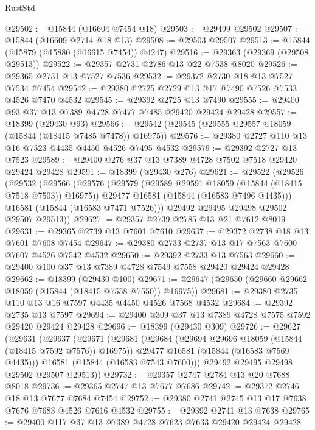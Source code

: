 \begin{lexlean}{RustStd}
\begin{coremodule}
@29502 := @15844 (@16604 @7454 @18)
@29503 := @29499 @29502
@29507 := @15844 (@16609 @2714 @18 @13)
@29508 := @29503 @29507
@29513 := @15844 (@15879 (@15880 (@16615 @7454)) @4247)
@29516 := @29363 (@29369 (@29508 @29513))
@29522 := @29357 @2731 @2786 @13 @22 @7538 @8020
@29526 := @29365 @2731 @13 @7527 @7536
@29532 := @29372 @2730 @18 @13 @7527 @7534 @7454
@29542 := @29380 @2725 @2729 @13 @17 @7490 @7526 @7533 @4526 @7470 @4532
@29545 := @29392 @2725 @13 @7490
@29555 := @29400 @93 @37 @13 @7389 @4728 @7477 @7485 @29420 @29424 @29428
@29557 := @18399 (@29430 @93)
@29566 := @29542 (@29545 (@29555 @29557 @18059 (@15844 (@18415 @7485 @7478)) @16975))
@29576 := @29380 @2727 @110 @13 @16 @7523 @4435 @4450 @4526 @7495 @4532
@29579 := @29392 @2727 @13 @7523
@29589 := @29400 @276 @37 @13 @7389 @4728 @7502 @7518 @29420 @29424 @29428
@29591 := @18399 (@29430 @276)
@29621 := @29522
    (@29526
      (@29532
        (@29566
          (@29576
            (@29579 (@29589 @29591 @18059 (@15844 (@18415 @7518 @7503)) @16975))
            @29477
            @16581
            (@15844 (@16583 @7496 @4435)))
          @16581
          (@15844 (@16583 @7471 @7526)))
        @29492
        @29495
        @29498
        @29502
        @29507
        @29513))
@29627 := @29357 @2739 @2785 @13 @21 @7612 @8019
@29631 := @29365 @2739 @13 @7601 @7610
@29637 := @29372 @2738 @18 @13 @7601 @7608 @7454
@29647 := @29380 @2733 @2737 @13 @17 @7563 @7600 @7607 @4526 @7542 @4532
@29650 := @29392 @2733 @13 @7563
@29660 := @29400 @100 @37 @13 @7389 @4728 @7549 @7558 @29420 @29424 @29428
@29662 := @18399 (@29430 @100)
@29671 := @29647 (@29650 (@29660 @29662 @18059 (@15844 (@18415 @7558 @7550)) @16975))
@29681 := @29380 @2735 @110 @13 @16 @7597 @4435 @4450 @4526 @7568 @4532
@29684 := @29392 @2735 @13 @7597
@29694 := @29400 @309 @37 @13 @7389 @4728 @7575 @7592 @29420 @29424 @29428
@29696 := @18399 (@29430 @309)
@29726 := @29627
    (@29631
      (@29637
        (@29671
          (@29681
            (@29684 (@29694 @29696 @18059 (@15844 (@18415 @7592 @7576)) @16975))
            @29477
            @16581
            (@15844 (@16583 @7569 @4435)))
          @16581
          (@15844 (@16583 @7543 @7600)))
        @29492
        @29495
        @29498
        @29502
        @29507
        @29513))
@29732 := @29357 @2747 @2784 @13 @20 @7688 @8018
@29736 := @29365 @2747 @13 @7677 @7686
@29742 := @29372 @2746 @18 @13 @7677 @7684 @7454
@29752 := @29380 @2741 @2745 @13 @17 @7638 @7676 @7683 @4526 @7616 @4532
@29755 := @29392 @2741 @13 @7638
@29765 := @29400 @117 @37 @13 @7389 @4728 @7623 @7633 @29420 @29424 @29428

\end{coremodule}
\end{lexlean}
